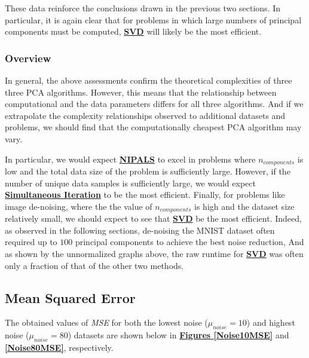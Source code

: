 \documentclass[12pt]{article}
\begin{document}
These data reinforce the conclusions drawn in the previous two sections. In particular, it is again clear that for problems in which large numbers of principal components must be computed, \textbf{\hyperref[3.2]{SVD}} will likely be the most efficient.

\subsubsection{Overview}\label{5.1.5}

In general, the above assessments confirm the theoretical complexities of three three PCA algorithms. However, this means that the relationship between computational and the data parameters differs for all three algorithms. And if we extrapolate the complexity relationships observed to additional datasets and problems, we should find that the computationally cheapest PCA algorithm may vary.

In particular, we would expect \textbf{\hyperref[3.1]{NIPALS}} to excel in problems where $n_{components}$ is low and the total data size of the problem is sufficiently large. However, if the number of unique data samples is sufficiently large, we would expect \textbf{\hyperref[3.3]{Simultaneous Iteration}} to be the most efficient. Finally, for problems like image de-noising, where the the value of $n_{components}$ is high and the dataset size relatively small, we should expect to see that \textbf{\hyperref[3.2]{SVD}} be the most efficient.
Indeed, as observed in the following sections, de-noising the MNIST dataset often required up to $100$ principal components to achieve the best noise reduction, And as shown by the unnormalized graphs above, the raw runtime for \textbf{\hyperref[3.2]{SVD}} was often only a fraction of that of the other two methods.

\subsection{Mean Squared Error}\label{5.2}

The obtained values of \textit{MSE} for both the lowest noise ($\mu_{noise}=10$) and highest noise ($\mu_{noise}=80$) datasets are shown below in \textbf{\hyperref[Noise10MSE]{Figures \ref*{Noise10MSE}}} and \textbf{\hyperref[Noise80MSE]{\ref*{Noise80MSE}}}, respectively.
\end{document}
